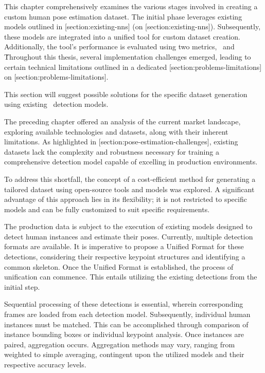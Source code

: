 This chapter comprehensively examines the various stages involved in creating a custom human pose estimation dataset. The initial phase leverages existing models outlined in [section:existing-nns] (on [section:existing-nns]). Subsequently, these models are integrated into a unified tool for custom dataset creation. Additionally, the tool's performance is evaluated using two metrics, \APE\ and \OKS\.

Throughout this thesis, several implementation challenges emerged, leading to certain technical limitations outlined in a dedicated [section:problems-limitations] on [section:problems-limitations].

This section will suggest possible solutions for the specific dataset generation using existing \NN\ detection models.

The preceding chapter offered an analysis of the current market landscape, exploring available technologies and datasets, along with their inherent limitations. As highlighted in [section:pose-estimation-challenges], existing datasets lack the complexity and robustness necessary for training a comprehensive detection model capable of excelling in production environments.

To address this shortfall, the concept of a cost-efficient method for generating a tailored dataset using open-source tools and models was explored. A significant advantage of this approach lies in its flexibility; it is not restricted to specific models and can be fully customized to suit specific requirements.

The production data is subject to the execution of existing models designed to detect human instances and estimate their poses. Currently, multiple detection formats are available. It is imperative to propose a Unified Format for these detections, considering their respective keypoint structures and identifying a common skeleton. Once the Unified Format is established, the process of unification can commence. This entails utilizing the existing detections from the initial step.

Sequential processing of these detections is essential, wherein corresponding frames are loaded from each detection model. Subsequently, individual human instances must be matched. This can be accomplished through comparison of instance bounding boxes or individual keypoint analysis. Once instances are paired, aggregation occurs. Aggregation methods may vary, ranging from weighted to simple averaging, contingent upon the utilized models and their respective accuracy levels.

